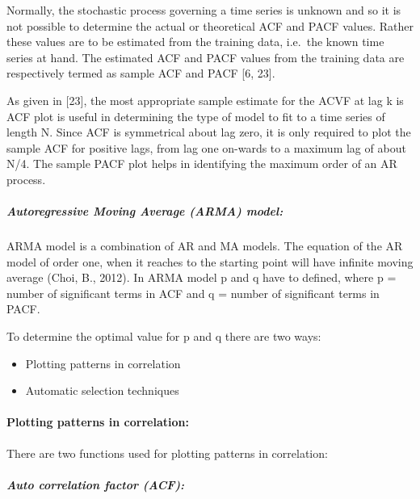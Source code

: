 \documentclass[
  letterpaper,
  DIV=11,
  numbers=noendperiod]{scrartcl}
\let\oldparagraph\paragraph
\renewcommand{\paragraph}[1]{\oldparagraph{#1}\mbox{}}
\let\oldsubparagraph\subparagraph
\renewcommand{\subparagraph}[1]{\oldsubparagraph{#1}\mbox{}}
\begin{document}
Normally, the stochastic process governing a time series is unknown and
so it is not possible to determine the actual or theoretical ACF and
PACF values. Rather these values are to be estimated from the training
data, i.e.~the known time series at hand. The estimated ACF and PACF
values from the training data are respectively termed as sample ACF and
PACF {[}6, 23{]}.

As given in {[}23{]}, the most appropriate sample estimate for the ACVF
at lag k is ACF plot is useful in determining the type of model to fit
to a time series of length N. Since ACF is symmetrical about lag zero,
it is only required to plot the sample ACF for positive lags, from lag
one on-wards to a maximum lag of about N/4. The sample PACF plot helps
in identifying the maximum order of an AR process.

\hypertarget{autoregressive-moving-average-arma-model}{%
\subparagraph{\texorpdfstring{\textbf{Autoregressive Moving Average
(ARMA)
model:}}{Autoregressive Moving Average (ARMA) model:}}\label{autoregressive-moving-average-arma-model}}

ARMA model is a combination of AR and MA models. The equation of the AR
model of order one, when it reaches to the starting point will have
infinite moving average (Choi, B., 2012). In ARMA model p and q have to
defined, where p = number of significant terms in ACF and q = number of
significant terms in PACF.

To determine the optimal value for p and q there are two ways:

\begin{itemize}
\item
  Plotting patterns in correlation
\item
  Automatic selection techniques
\end{itemize}

\hypertarget{plotting-patterns-in-correlation}{%
\paragraph{\texorpdfstring{\textbf{Plotting patterns in
correlation:}}{Plotting patterns in correlation:}}\label{plotting-patterns-in-correlation}}

There are two functions used for plotting patterns in correlation:

\hypertarget{auto-correlation-factor-acf}{%
\subparagraph{\texorpdfstring{\textbf{Auto correlation factor
(ACF):}}{Auto correlation factor (ACF):}}\label{auto-correlation-factor-acf}}
\end{document}
